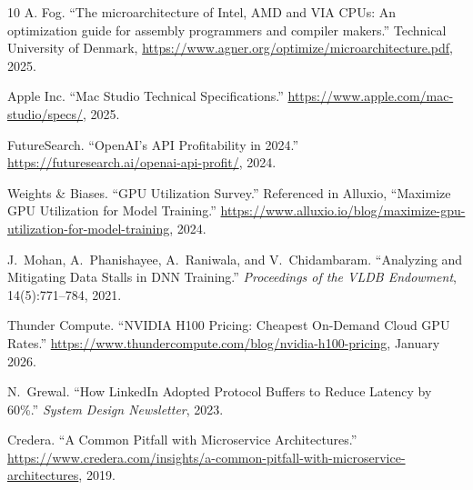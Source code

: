 \documentclass[11pt,onecolumn]{article}
\begin{document}
\begin{thebibliography}{10}
A. Fog. ``The microarchitecture of Intel, AMD and VIA CPUs: An optimization guide for assembly programmers and compiler makers.'' Technical University of Denmark, \url{https://www.agner.org/optimize/microarchitecture.pdf}, 2025.

Apple Inc. ``Mac Studio Technical Specifications.'' \url{https://www.apple.com/mac-studio/specs/}, 2025.

FutureSearch. ``OpenAI's API Profitability in 2024.'' \url{https://futuresearch.ai/openai-api-profit/}, 2024.

Weights \& Biases. ``GPU Utilization Survey.'' Referenced in Alluxio, ``Maximize GPU Utilization for Model Training.'' \url{https://www.alluxio.io/blog/maximize-gpu-utilization-for-model-training}, 2024.

J.~Mohan, A.~Phanishayee, A.~Raniwala, and V.~Chidambaram.
``Analyzing and Mitigating Data Stalls in DNN Training.''
\textit{Proceedings of the VLDB Endowment}, 14(5):771--784, 2021.

Thunder Compute. ``NVIDIA H100 Pricing: Cheapest On-Demand Cloud GPU Rates.'' \url{https://www.thundercompute.com/blog/nvidia-h100-pricing}, January 2026.

N.~Grewal. ``How LinkedIn Adopted Protocol Buffers to Reduce Latency by 60\%.'' \textit{System Design Newsletter}, 2023.

Credera. ``A Common Pitfall with Microservice Architectures.'' \url{https://www.credera.com/insights/a-common-pitfall-with-microservice-architectures}, 2019.

\end{thebibliography}
\end{document}
